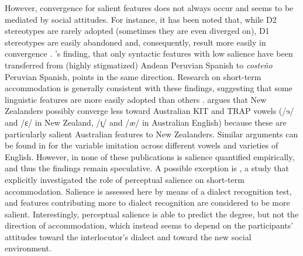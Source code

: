 \documentclass[output=paper,
modfonts
]{langscibook}
\begin{document}
However, convergence for salient features does not always occur and seems to be mediated by social attitudes. For instance, it has been noted that, while D2 stereotypes are rarely adopted (sometimes they are even diverged on), D1 stereotypes are easily abandoned and, consequently, result more easily in convergence \citep{trudgill_dialects_1986,erker_contact_2016}. \citeauthor{Escobar2007}'s \citeyear{Escobar2007} finding, that only syntactic features with low salience have been transferred from (highly stigmatized) Andean Peruvian Spanish to \textit{costeño} Peruvian Spanish, points in the same direction. Research on short-term accommodation is generally consistent with these findings, suggesting that some linguistic features are more easily adopted than others \citep{babel_dialect_2010,walker_repeat_2015}. \citet{babel_dialect_2010} argues that New Zealanders possibly converge less toward Australian KIT and TRAP vowels (/ɘ/ and /ɛ/ in New Zealand, /ɪ̠/ and /æ/ in Australian English) because these are particularly salient Australian features to New Zealanders. Similar arguments can be found in \citet{walker_repeat_2015} for the variable imitation across different vowels and varieties of English. However, in none of these publications is salience quantified empirically, and thus the findings remain speculative. A possible exception is \cite{macleod_effect_2012}, a study that explicitly investigated the role of perceptual salience on short-term accommodation. Salience is assessed here by means of a dialect recognition test, and features contributing more to dialect recognition are considered to be more salient. Interestingly, perceptual salience is able to predict the degree, but not the direction of accommodation, which instead seems to depend on the participants' attitudes toward the interlocutor's dialect and toward the new social environment. %
% 
\end{document}
